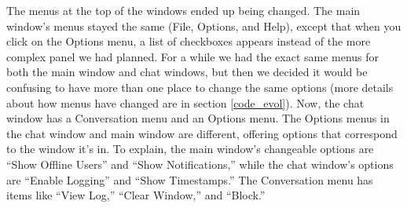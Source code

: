 The menus at the top of the windows ended up being changed. The main window's menus stayed the same (File, Options, and Help), except that when you click on the Options menu, a list of checkboxes appears instead of the more complex panel we had planned. For a while we had the exact same menus for both the main window and chat windows, but then we decided it would be confusing to have more than one place to change the same options (more details about how menus have changed are in section \ref{code_evol}). Now, the chat window has a Conversation menu and an Options menu. The Options menus in the chat window and main window are different, offering options that correspond to the window it's in. To explain, the main window's changeable options are ``Show Offline Users'' and ``Show Notifications,'' while the chat window's options are ``Enable Logging'' and ``Show Timestamps.'' The Conversation menu has items like ``View Log,'' ``Clear Window,'' and ``Block.''


